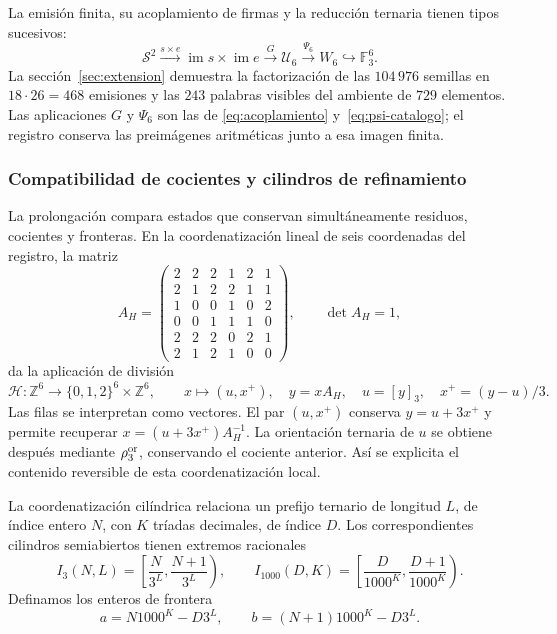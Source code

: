 




La emisión finita, su acoplamiento de firmas y la reducción ternaria tienen
tipos sucesivos:
\[
 \mathcal S^2\xrightarrow{s\times e}
 \operatorname{im}s\times\operatorname{im}e
 \xrightarrow{G}\mathcal U_6
 \xrightarrow{\Psi_6}W_6\hookrightarrow\mathbb F_3^6.
\]
La sección~\ref{sec:extension} demuestra la factorización de las
\(104\,976\) semillas en \(18\cdot26=468\) emisiones y las
\(243\) palabras visibles del ambiente de \(729\) elementos. Las
aplicaciones \(G\) y \(\Psi_6\) son las de
\eqref{eq:acoplamiento} y~\eqref{eq:psi-catalogo}; el registro conserva
las preimágenes aritméticas junto a esa imagen finita.

\subsubsection{Compatibilidad de cocientes y cilindros de refinamiento}

La prolongación compara estados que conservan simultáneamente residuos,
cocientes y fronteras. En la coordenatización lineal de seis coordenadas del registro,
la matriz
\[
 A_H=\begin{pmatrix}
 2&2&2&1&2&1\\2&1&2&2&1&1\\1&0&0&1&0&2\\
 0&0&1&1&1&0\\2&2&2&0&2&1\\2&1&2&1&0&0
 \end{pmatrix},\qquad\det A_H=1,
\]
da la aplicación de división
\begin{equation}
 \mathcal H:\mathbb Z^6\longrightarrow
 \{0,1,2\}^6\times\mathbb Z^6,\qquad
 x\longmapsto(u,x^+),\quad
 y=xA_H,\quad u=[y]_3,\quad x^+=(y-u)/3.
 \label{ii:tpk-hensel-local}
\end{equation}
Las filas se interpretan como vectores. El par \((u,x^+)\) conserva
\(y=u+3x^+\) y permite recuperar
\(x=(u+3x^+)A_H^{-1}\). La orientación ternaria de \(u\) se obtiene
después mediante \(\rho_3^{\rm or}\), conservando el cociente anterior.
Así se explicita el contenido reversible de esta coordenatización local.

La coordenatización cilíndrica relaciona un prefijo ternario de longitud \(L\), de
índice entero \(N\), con \(K\) tríadas decimales, de índice \(D\).
Los correspondientes cilindros semiabiertos tienen extremos racionales
\[
 I_3(N,L)=\left[\frac N{3^L},\frac{N+1}{3^L}\right),\qquad
 I_{1000}(D,K)=\left[\frac D{1000^K},\frac{D+1}{1000^K}\right).
\]
Definamos los enteros de frontera
\[
 a=N1000^K-D3^L,\qquad b=(N+1)1000^K-D3^L.
\]

